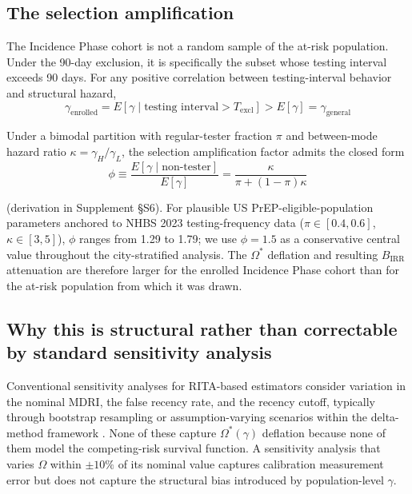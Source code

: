 \documentclass[12pt]{article}
\begin{document}
\subsection{The selection amplification}

The Incidence Phase cohort is not a random sample of the at-risk population. Under the 90-day exclusion, it is specifically the subset whose testing interval exceeds 90 days. For any positive correlation between testing-interval behavior and structural hazard,
\begin{equation}
\gamma_{\mathrm{enrolled}} = E[\gamma \mid \text{testing interval} > T_{\mathrm{excl}}] > E[\gamma] = \gamma_{\mathrm{general}}
\end{equation}

Under a bimodal partition with regular-tester fraction $\pi$ and between-mode hazard ratio $\kappa = \gamma_H / \gamma_L$, the selection amplification factor admits the closed form
\begin{equation}
\phi \equiv \frac{E[\gamma \mid \text{non-tester}]}{E[\gamma]} = \frac{\kappa}{\pi + (1 - \pi)\kappa}
\end{equation}

(derivation in Supplement \S S6). For plausible US PrEP-eligible-population parameters anchored to NHBS 2023 testing-frequency data \cite{cdc_nhbs2023} ($\pi \in [0.4, 0.6]$, $\kappa \in [3, 5]$), $\phi$ ranges from 1.29 to 1.79; we use $\phi = 1.5$ as a conservative central value throughout the city-stratified analysis. The $\Omega^*$ deflation and resulting $B_{\mathrm{IRR}}$ attenuation are therefore larger for the enrolled Incidence Phase cohort than for the at-risk population from which it was drawn.

\subsection{Why this is structural rather than correctable by standard sensitivity analysis}

Conventional sensitivity analyses for RITA-based estimators consider variation in the nominal MDRI, the false recency rate, and the recency cutoff, typically through bootstrap resampling or assumption-varying scenarios within the delta-method framework \cite{gao2021}. None of these capture $\Omega^*(\gamma)$ deflation because none of them model the competing-risk survival function. A sensitivity analysis that varies $\Omega$ within $\pm 10\%$ of its nominal value captures calibration measurement error but does not capture the structural bias introduced by population-level $\gamma$.
\end{document}
